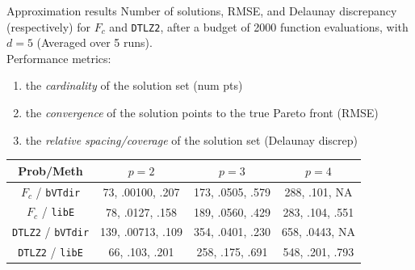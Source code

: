 \documentclass[xcolor=dvipsnames]{beamer}
\begin{document}
\begin{frame}{Approximation results}
Number of solutions, RMSE, and Delaunay discrepancy (respectively)
for $F_c$ and {\tt DTLZ2}, after a budget of 2000 function evaluations,
with $d=5$ (Averaged over 5 runs).\\
\medskip
Performance metrics:
\begin{enumerate}
\item the {\it cardinality} of the solution set (num pts)
\item the {\it convergence} of the solution points to the true Pareto front (RMSE)
\item the {\it relative spacing/coverage} of the solution set (Delaunay discrep)
\end{enumerate}
\begin{center}
{\tiny
\begin{tabular}{c|ccc}
Prob/Meth&$p=2$&$p=3$&$p=4$\\
\hline
{$F_c$ / {\tt bVTdir}} & 73, .00100, .207 & 173, .0505, .579 & 288, .101, NA\\
{$F_c$ / {\tt libE}} & 78, .0127, .158 & 189, .0560, .429 & 283, .104, .551\\
{{\tt DTLZ2} / {\tt bVTdir}} & 139, .00713, .109 & 354, .0401, .230 & 658, .0443, NA\\
{{\tt DTLZ2} / {\tt libE}} & 66, .103, .201 & 258, .175, .691 & 548, .201, .793\\
\end{tabular}
}
\end{center}
\end{frame}
\end{document}
